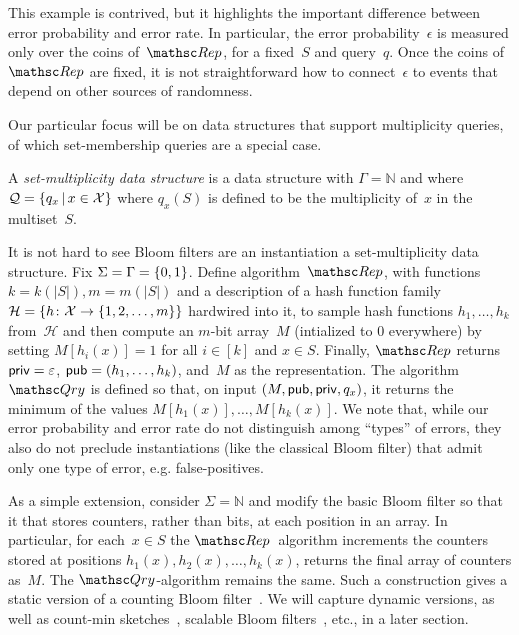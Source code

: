 This example is contrived, but it highlights the important
difference between error probability and error rate.  In particular,
the error probability~$\epsilon$ is measured only over the coins
of~$\Rep$, for a fixed~$S$ and query~$q$. Once the coins of~$\Rep$
are fixed, it is not straightforward how to connect~$\epsilon$ to
events that depend on other sources of randomness. 


 Our particular focus
will be on data structures that support multiplicity queries, of
which set-membership queries are a special case.
\begin{definition} A \emph{set-multiplicity data structure} is a data
structure with $\Gamma=\mathbb{N}$ and
where ${\cal Q}=\{q_x \,|\, x \in {\cal X}\}$ where $q_x(S)$ is defined to
be the multiplicity of~$x$ in the multiset~$S$. \hfill\dqed
\end{definition}

It is not hard to see Bloom filters are an instantiation a
set-multiplicity data structure.  Fix $\Sigma=\Gamma=\{0,1\}$.  Define
algorithm~$\Rep$, with functions $k=k(|S|), m=m(|S|)$ and a
description of a hash function family~$\mathcal{H}=\{h \colon {\cal X}
\to \{1,2,\ldots,m\}\}$ hardwired into it, to sample hash functions
$h_1, \ldots, h_k$ from~$\mathcal{H}$ and then compute an $m$-bit
array~$M$ (intialized to 0 everywhere) by setting $M[h_i(x)]=1$ for
all $i\in [k]$ and $x \in S$.  Finally, $\Rep$ returns
${\sf priv}=\varepsilon$, ${\sf pub} = (h_1,\ldots, h_k)$, and~$M$ as the
representation.  
%
The algorithm~$\Qry$ is defined so that, on input $(M,{\sf pub},{\sf priv},q_x)$, it
returns the minimum of the values $M[h_1(x)],\ldots,M[h_k(x)]$.  We note that, while our error
probability and error rate do not distinguish among ``types'' of
errors, they also do not preclude instantiations (like the classical
Bloom filter) that admit only one type of error, e.g.
false-positives.

As a simple extension, consider $\Sigma=\mathbb{N}$ and modify the
basic Bloom filter so that it that stores counters, rather than
bits, at each position in an array.  In particular, for each~$x \in
S$ the $\Rep$~algorithm increments the counters stored at positions
$h_1(x), h_2(x), \ldots, h_k(x)$, returns the final array of
counters as~$M$.  The $\Qry$-algorithm remains the same. Such a
construction gives a static version of a counting Bloom
filter~\cite{xxx}.  We will capture dynamic versions, as well as
count-min sketches~\cite{xxx}, scalable Bloom filters~\cite{xxx},
etc., in a later section.

